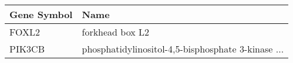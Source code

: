 \begin{tabular}{ll}
\toprule
Gene Symbol &                                               Name \\
\midrule
      FOXL2 &                                    forkhead box L2 \\
     PIK3CB & phosphatidylinositol-4,5-bisphosphate 3-kinase ... \\
\bottomrule
\end{tabular}
